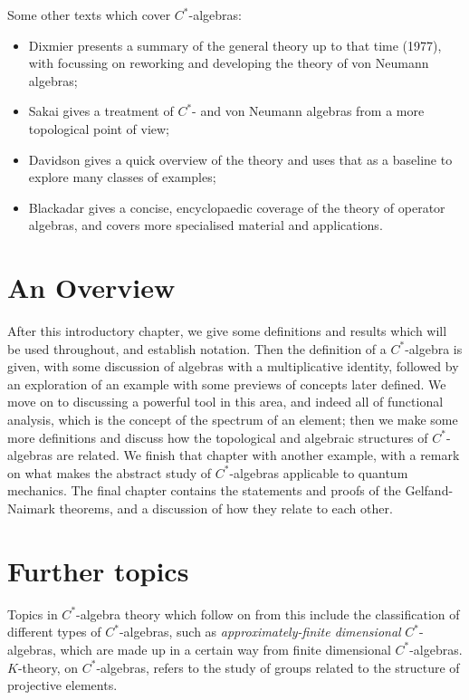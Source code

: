 \documentclass[12pt,a4paper]{report}
\theoremstyle{plain}
\theoremstyle{definition}
\newcommand{\1}{\mathbbm{1}}
\begin{document}
Some other texts which cover $C^\ast$-algebras: 
\begin{itemize}
	\item 	Dixmier \cite{dixmier77} presents a summary of the general theory up to that time (1977), 
	with \cite{dixmier81} focussing on reworking and developing the theory of von Neumann algebras; 
	\item 	Sakai \cite{sakai71} gives a treatment of $C^\ast$- and von Neumann algebras from a more 
	topological point of view; 
	\item	Davidson \cite{davidson96} gives a quick overview of the theory and uses that as a baseline 
	to explore many classes of examples;
	\item 	Blackadar \cite{blackadar06} gives a concise, encyclopaedic coverage of the theory of 
	operator algebras, and covers more specialised material and applications. 
\end{itemize}
	
\section{An Overview}

After this introductory chapter, we give some definitions and results which will be used throughout, and 
establish notation. Then the definition of a $C^\ast$-algebra is given, with some discussion of algebras 
with a multiplicative identity, followed by an exploration of an example with some previews of concepts 
later defined. We move on to discussing a powerful tool in this area, and indeed all of functional 
analysis, which is the concept of the spectrum of an element; then we make some more definitions and 
discuss how the topological and algebraic structures of $C^\ast$-algebras are related. We finish that 
chapter with another example, with a remark on what makes the abstract study of $C^\ast$-algebras 
applicable to quantum mechanics. The final chapter contains the statements and proofs of the 
Gelfand-Naimark theorems, and a discussion of how they relate to each other.



\section{Further topics}

Topics in $C^\ast$-algebra theory which follow on from this include the classification of different 
types of $C^\ast$-algebras, such as \emph{approximately-finite dimensional} $C^\ast$-algebras, which are 
made up in a certain way from finite dimensional $C^\ast$-algebras. 
$K$-theory, on $C^\ast$-algebras, refers to the study of groups related to the structure of projective 
elements.
\end{document}
